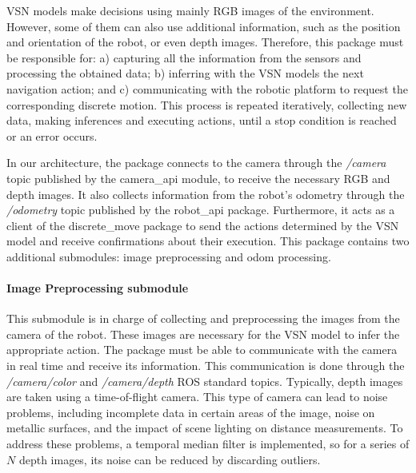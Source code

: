 VSN models make decisions using mainly RGB images of the environment.
However, some of them can also use additional information, such as the position and orientation of the robot, or even depth images.
Therefore, this package must be responsible for: a) capturing all the information from the sensors and processing the obtained data; b) inferring with the VSN models the next navigation action; and c) communicating with the robotic platform to request the corresponding discrete motion.
This process is repeated iteratively, collecting new data, making inferences and executing actions, until a stop condition is reached or an error occurs.

In our architecture, the package connects to the camera through the \textit{/camera} topic published by the camera\_api module, to receive the necessary RGB and depth images.
It also collects information from the robot's odometry through the \textit{/odometry} topic published by the robot\_api package.
Furthermore, it acts as a client of the discrete\_move package to send the actions determined by the VSN model and receive confirmations about their execution.
This package contains two additional submodules: image preprocessing and odom processing.




\paragraph{Image Preprocessing submodule}\label{par:image-preprocessing}

This submodule is in charge of collecting and preprocessing the images from the camera of the robot.
These images are necessary for the VSN model to infer the appropriate action.
The package must be able to communicate with the camera in real time and receive its information.
This communication is done through the \textit{/camera/color} and \textit{/camera/depth} ROS standard topics.
Typically, depth images are taken using a time-of-flight camera.
This type of camera can lead to noise problems, including incomplete data in certain areas of the image, noise on metallic surfaces, and the impact of scene lighting on distance measurements.
To address these problems, a temporal median filter is implemented, so for a series of $N$ depth images, its noise can be reduced by discarding outliers.

